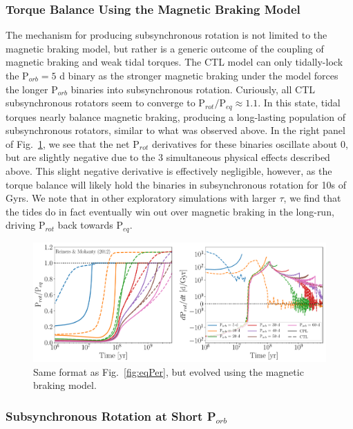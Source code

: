 \documentclass[twocolumn]{aastex61}
\begin{document}
\subsubsection{Torque Balance Using the \citet{Reiners2012} Magnetic Braking Model}

The mechanism for producing subsynchronous rotation is not limited to the \citet{Matt2015} magnetic braking model, but rather is a generic outcome of the coupling of magnetic braking and weak tidal torques. The CTL model can only tidally-lock the P$_{orb} = 5$ d binary as the stronger magnetic braking under the \citet{Reiners2012} model forces the longer P$_{orb}$ binaries into subsynchronous rotation. Curiously, all CTL subsynchronous rotators seem to converge to P$_{rot}/$P$_{eq} \approx 1.1$.  In this state, tidal torques nearly balance magnetic braking, producing a long-lasting population of subsynchronous rotators, similar to what was observed above.  In the right panel of Fig.~\ref{fig:eqPerReiners}, we see that the net P$_{rot}$ derivatives for these binaries oscillate about 0, but are slightly negative due to the 3 simultaneous physical effects described above. This slight negative derivative is effectively negligible, however, as the torque balance will likely hold the binaries in subsynchronous rotation for 10s of Gyrs.  We note that in other exploratory simulations with larger $\tau$, we find that the tides do in fact eventually win out over magnetic braking in the long-run, driving P$_{rot}$ back towards P$_{eq}$.

\begin{figure}
	\includegraphics[width=\textwidth]{../Plots/eqPerTwoPanelReiners.pdf}
   \caption{Same format as Fig.~\ref{fig:eqPer}, but evolved using the \citet{Reiners2012} magnetic braking model.}%
    \label{fig:eqPerReiners}%
\end{figure}

\subsubsection{Subsynchronous Rotation at Short P$_{orb}$}
\end{document}
